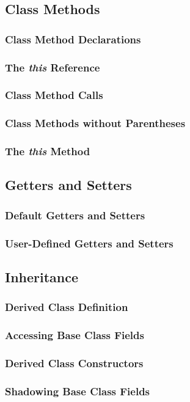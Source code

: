 \documentclass[10pt,twoside,titlepage]{article}
\begin{document}
\subsection{Class Methods}
\subsubsection{Class Method Declarations}
\subsubsection{The {\em this} Reference}
\subsubsection{Class Method Calls}
\subsubsection{Class Methods without Parentheses}
\subsubsection{The {\em this} Method}
\subsection{Getters and Setters}
\subsubsection{Default Getters and Setters}
\subsubsection{User-Defined Getters and Setters}
\subsection{Inheritance}
\subsubsection{Derived Class Definition}
\subsubsection{Accessing Base Class Fields}
\subsubsection{Derived Class Constructors}
\subsubsection{Shadowing Base Class Fields}
\end{document}
